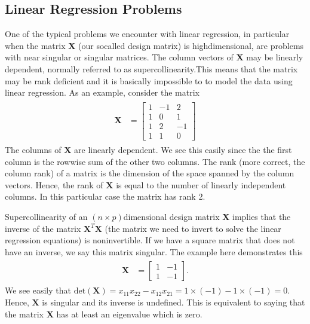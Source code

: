 \documentclass[letterpaper,10pt,english]{sphinxmanual}
\begin{document}
\subsection{Linear Regression Problems}
\label{\detokenize{chapter4:linear-regression-problems}}
One of the typical problems we encounter with linear regression, in particular
when the matrix \(\boldsymbol{X}\) (our so\sphinxhyphen{}called design matrix) is high\sphinxhyphen{}dimensional,
are problems with near singular or singular matrices. The column vectors of \(\boldsymbol{X}\)
may be linearly dependent, normally referred to as super\sphinxhyphen{}collinearity.This means that the matrix may be rank deficient and it is basically impossible to
to model the data using linear regression. As an example, consider the matrix
\begin{equation*}
\begin{split}
\begin{align*}
\mathbf{X} & =  \left[
\begin{array}{rrr}
1 & -1 & 2
\\
1 & 0 & 1
\\
1 & 2  & -1
\\
1 & 1  & 0
\end{array} \right]
\end{align*}
\end{split}
\end{equation*}
The columns of \(\boldsymbol{X}\) are linearly dependent. We see this easily since the
the first column is the row\sphinxhyphen{}wise sum of the other two columns. The rank (more correct,
the column rank) of a matrix is the dimension of the space spanned by the
column vectors. Hence, the rank of \(\mathbf{X}\) is equal to the number
of linearly independent columns. In this particular case the matrix has rank 2.

Super\sphinxhyphen{}collinearity of an \((n \times p)\)\sphinxhyphen{}dimensional design matrix \(\mathbf{X}\) implies
that the inverse of the matrix \(\boldsymbol{X}^T\boldsymbol{X}\) (the matrix we need to invert to solve the linear regression equations) is non\sphinxhyphen{}invertible. If we have a square matrix that does not have an inverse, we say this matrix singular. The example here demonstrates this
\begin{equation*}
\begin{split}
\begin{align*}
\boldsymbol{X} & =  \left[
\begin{array}{rr}
1 & -1
\\
1 & -1
\end{array} \right].
\end{align*}
\end{split}
\end{equation*}
We see easily that  \(\mbox{det}(\boldsymbol{X}) = x_{11} x_{22} - x_{12} x_{21} = 1 \times (-1) - 1 \times (-1) = 0\). Hence, \(\mathbf{X}\) is singular and its inverse is undefined.
This is equivalent to saying that the matrix \(\boldsymbol{X}\) has at least an eigenvalue which is zero.
\end{document}
